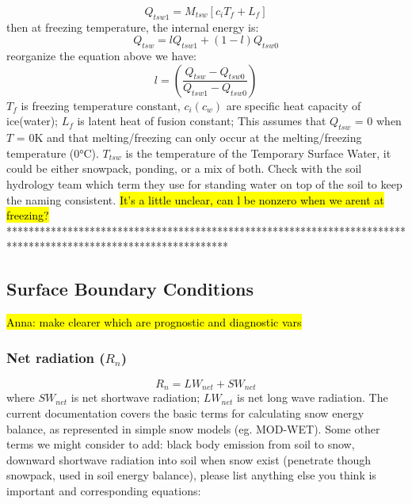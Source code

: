 \documentclass{article}
\begin{document}
\begin{equation}
Q_{tsw1} = M_{tsw}[c_iT_f+L_f]
\end{equation}
then at freezing temperature, the internal energy is:
\begin{equation}
Q_{tsw} = lQ_{tsw1}+(1-l)Q_{tsw0}
\end{equation}
reorganize the equation above we have:
\begin{equation}
l = (\frac{Q_{tsw}-Q_{tsw0}}{Q_{tsw1}-Q_{tsw0}})
\end{equation}
$T_f$ is freezing temperature constant, $c_i(c_w)$ are specific heat capacity of ice(water); $L_f$ is latent heat of fusion constant; This assumes that $Q_{tsw}$ = 0 when $T$ = 0K and that melting/freezing can only occur at the melting/freezing temperature (0°C). $T_{tsw}$ is the temperature of the Temporary Surface Water, it could be either snowpack, ponding, or a mix of both. Check with the soil hydrology team which term they use for standing water on top of the soil to keep the naming consistent.
\hl{It's a little unclear, can l be nonzero when we arent at freezing?}
****************************************************************************************************************



\subsection{Surface Boundary Conditions}

\hl{Anna: make clearer which are prognostic and diagnostic vars}
\subsubsection{Net radiation ($R_n$)}
\begin{equation}
R_n = LW_{net} + SW_{net}
\end{equation}
where $SW_{net}$ is net shortwave radiation; $LW_{net}$ is  net long wave radiation.
The current documentation covers the basic terms for calculating snow energy balance, as represented in simple snow models (eg. MOD-WET). Some other terms we might consider to add: black body emission from soil to snow, downward shortwave radiation into soil when snow exist (penetrate though snowpack, used in soil energy balance), please list anything else you think is important and corresponding equations:
\end{document}
